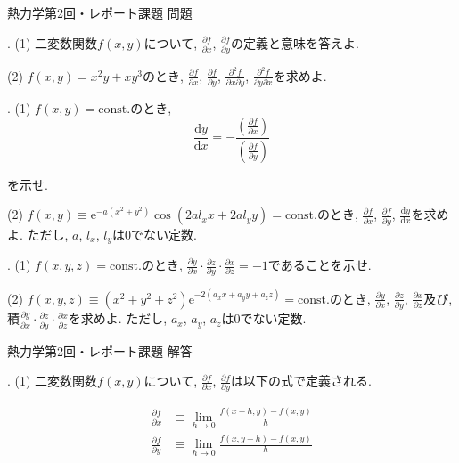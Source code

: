 \documentclass[dvipdfmx]{jsarticle}
\begin{document}
\centerline{熱力学第2回・レポート課題 問題}
\medskip
{}
\bigskip


. (1) 二変数関数$f(x, y)$について, $\displaystyle\frac{\partial f}{\partial x}$, $\displaystyle\frac{\partial f}{\partial y}$の定義と意味を答えよ. 

(2) $f(x, y) = x^2 y + x y^3$のとき, $\displaystyle\frac{\partial f}{\partial x}$, $\displaystyle\frac{\partial f}{\partial y}$, $\displaystyle\frac{\partial ^2 f}{\partial x \partial y}$, $\displaystyle\frac{\partial ^2 f}{\partial y \partial x}$を求めよ. 


. (1) $f(x, y) = \mathrm{const.}$のとき, 
\[
    \frac{\mathrm{d} y}{\mathrm{d} x} = - \frac{\left(\frac{\partial f}{\partial x}\right)}{\left(\frac{\partial f}{\partial y}\right)}
\]

を示せ. 

(2) $f(x, y) \equiv \mathrm{e}^{-a(x^2 + y^2)}\cos{(2 a l_x x + 2 a l_y y)} = \mathrm{const.}$のとき, $\displaystyle\frac{\partial f}{\partial x}$, $\displaystyle\frac{\partial f}{\partial y}$, $\displaystyle\frac{\mathrm{d} y}{\mathrm{d} x}$を求めよ. ただし, $a$, $l_x$, $l_y$は0でない定数. 

. (1) $f(x, y, z) = \mathrm{const.}$のとき, $\displaystyle\frac{\partial y}{\partial x} \cdot \displaystyle\frac{\partial z}{\partial y} \cdot \displaystyle\frac{\partial x}{\partial z} = -1$であることを示せ. 

(2) $f(x, y, z) \equiv (x^2 + y^2 + z^2) \mathrm{e}^{-2(a_x x + a_y y + a_z z)} = \mathrm{const.}$のとき, $\displaystyle\frac{\partial y}{\partial x}$, $\displaystyle\frac{\partial z}{\partial y}$, $\displaystyle\frac{\partial x}{\partial z}$及び, 積$\displaystyle\frac{\partial y}{\partial x} \cdot \displaystyle\frac{\partial z}{\partial y} \cdot \displaystyle\frac{\partial x}{\partial z}$を求めよ. ただし, $a_x$, $a_y$, $a_z$は0でない定数. 

\newpage

\centerline{熱力学第2回・レポート課題 解答}
\medskip

\bigskip


. (1) 二変数関数$f(x, y)$について, $\displaystyle\frac{\partial f}{\partial x}$, $\displaystyle\frac{\partial f}{\partial y}$は以下の式で定義される. 

\begin{align*}
    \frac{\partial f}{\partial x} &\equiv \lim_{h \to 0} \frac{f(x + h, y) - f(x, y)}{h} \\
    \frac{\partial f}{\partial y} &\equiv \lim_{h \to 0} \frac{f(x, y + h) - f(x, y)}{h} 
\end{align*}
\end{document}
